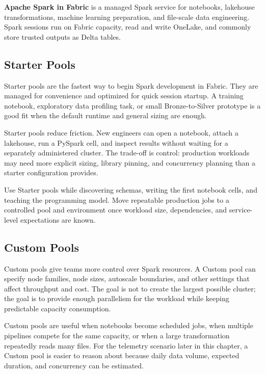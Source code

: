 \begin{definitionbox}
\textbf{Apache Spark in Fabric} is a managed Spark service for notebooks, lakehouse transformations, machine learning preparation, and file-scale data engineering. Spark sessions run on Fabric capacity, read and write OneLake, and commonly store trusted outputs as Delta tables.
\end{definitionbox}

\subsection{Starter Pools}
Starter pools are the fastest way to begin Spark development in Fabric. They are managed for convenience and optimized for quick session startup. A training notebook, exploratory data profiling task, or small Bronze-to-Silver prototype is a good fit when the default runtime and general sizing are enough.

Starter pools reduce friction. New engineers can open a notebook, attach a lakehouse, run a PySpark cell, and inspect results without waiting for a separately administered cluster. The trade-off is control: production workloads may need more explicit sizing, library pinning, and concurrency planning than a starter configuration provides.

\begin{tipbox}
Use Starter pools while discovering schemas, writing the first notebook cells, and teaching the programming model. Move repeatable production jobs to a controlled pool and environment once workload size, dependencies, and service-level expectations are known.
\end{tipbox}

\subsection{Custom Pools}
Custom pools give teams more control over Spark resources. A Custom pool can specify node families, node sizes, autoscale boundaries, and other settings that affect throughput and cost. The goal is not to create the largest possible cluster; the goal is to provide enough parallelism for the workload while keeping predictable capacity consumption.

Custom pools are useful when notebooks become scheduled jobs, when multiple pipelines compete for the same capacity, or when a large transformation repeatedly reads many files. For the telemetry scenario later in this chapter, a Custom pool is easier to reason about because daily data volume, expected duration, and concurrency can be estimated.

